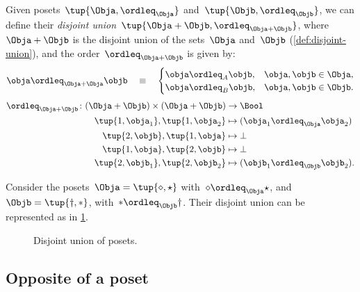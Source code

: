 \begin{definition}
  Given posets~$\tup{\Obja, \ordleq_\Obja}$ and~$\tup{\Objb, \ordleq_\Objb}$, we can define their \emph{disjoint union}~$\tup{\Obja + \Objb, \ordleq_{\Obja + \Objb}}$, where~$\Obja + \Objb$
  is the disjoint union of the sets~$\Obja$ and~$\Objb$ (\cref{def:disjoint-union}), and the
  order~$\ordleq_{\Obja + \Objb}$ is given by:
  \begin{equation}
    \obja \ordleq_{\Obja + \Obja} \objb \quad\equiv\quad
    \begin{cases}
      \obja \ordleq_A \objb, & \obja,\objb \in \Obja, \\
      \obja \ordleq_B \objb, & \obja,\objb \in \Objb.
    \end{cases}
  \end{equation}
  \begin{equation}
    \begin{aligned}
      \ordleq_{\Obja+\Objb}\colon (\Obja+\Objb)\times (\Obja+\Objb)&\to \Bool\\
      \tup{1,\obja_1},\tup{1,\obja_2}&\mapsto (\obja_1\ordleq_{\Obja} \obja_2)\\
      \tup{2,\objb},\tup{1,\obja}&\mapsto \bot\\
      \tup{1,\obja},\tup{2,\objb}&\mapsto \bot\\
      \tup{2,\objb_1},\tup{2,\objb_2}&\mapsto (\objb_1\ordleq_\Objb \objb_2).
    \end{aligned}
  \end{equation}
\end{definition}


\begin{example}
  Consider the posets~$\Obja=\tup{\diamond, \star}$ with~$\diamond \ordleq_\Obja \star$, and~$\Objb=\tup{\dagger,\ast}$, with~$\ast \ordleq_\Objb \dagger$. Their disjoint union can be represented as in \cref{fig:poset-coproduct}.

  \begin{figure}[h!]
    \centering
    \caption{Disjoint union of posets. \label{fig:poset-coproduct}}
  \end{figure}
\end{example}

\subsection{Opposite of a poset}\label{subsec:opposite-of-a-poset}

